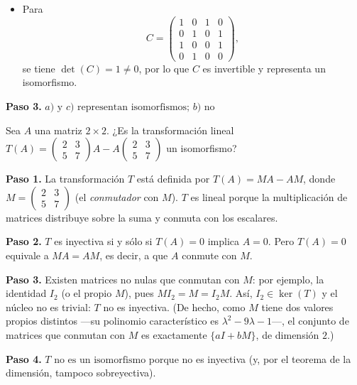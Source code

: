 \begin{prob}
\begin{myproof}
\begin{itemize}
    \item[c)] Para
    \[
    C = \begin{pmatrix} 1 & 0 & 1 & 0 \\ 0 & 1 & 0 & 1 \\ 1 & 0 & 0 & 1 \\ 0 & 1 & 0 & 0 \end{pmatrix},
    \]
    se tiene $\det(C) = 1 \neq 0$, por lo que $C$ es invertible y representa un isomorfismo.
\end{itemize}

\textbf{Paso 3.} $\boxed{a) \text{ y } c) \text{ representan isomorfismos; } b) \text{ no}}$
\end{myproof}
\end{prob}

\begin{prob}
Sea $A$ una matriz $2\times 2.$ ¿Es la transformación lineal $T(A)=\begin{pmatrix} 
2 & 3\\ 
5 & 7 
\end{pmatrix}A - A\begin{pmatrix} 
2 & 3\\ 
5 & 7 
\end{pmatrix}$ un isomorfismo?
\begin{myproof}
\textbf{Paso 1.} La transformación $T$ está definida por $T(A) = MA - AM$, donde $M = \begin{pmatrix} 2 & 3 \\ 5 & 7 \end{pmatrix}$ (el \emph{conmutador} con $M$). $T$ es lineal porque la multiplicación de matrices distribuye sobre la suma y conmuta con los escalares.

\textbf{Paso 2.} $T$ es inyectiva si y sólo si $T(A) = 0$ implica $A = 0$. Pero $T(A) = 0$ equivale a $MA = AM$, es decir, a que $A$ conmute con $M$.

\textbf{Paso 3.} Existen matrices no nulas que conmutan con $M$: por ejemplo, la identidad $I_2$ (o el propio $M$), pues $MI_2 = M = I_2M$. Así, $I_2 \in \ker(T)$ y el núcleo no es trivial: $T$ no es inyectiva. (De hecho, como $M$ tiene dos valores propios distintos —su polinomio característico es $\lambda^2 - 9\lambda - 1$—, el conjunto de matrices que conmutan con $M$ es exactamente $\{aI + bM\}$, de dimensión $2$.)

\textbf{Paso 4.} $\boxed{T \text{ no es un isomorfismo}}$ porque no es inyectiva (y, por el teorema de la dimensión, tampoco sobreyectiva).
\end{myproof}
\end{prob}

